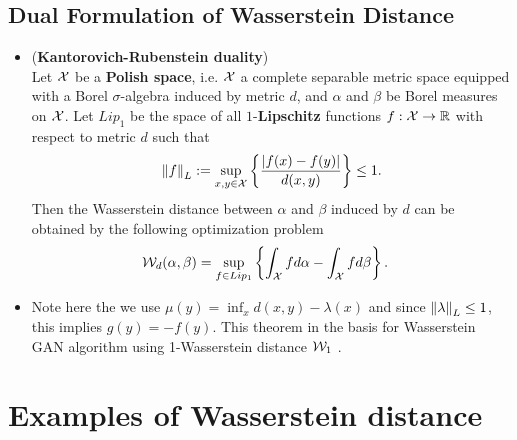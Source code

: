 \documentclass[11pt]{article}
\begin{document}
\subsection{Dual Formulation of Wasserstein Distance}
\begin{itemize}
\item \begin{theorem} (\textbf{Kantorovich-Rubenstein duality}) \citep{villani2009optimal}\\
Let ${\mathcal X}$ be a \textbf{Polish space}, i.e. ${\mathcal X}$ a complete separable metric space equipped with a Borel $\sigma$-algebra induced by metric $d$, and $\alpha$ and $\beta$ be Borel measures on ${\mathcal X}$. Let $Lip_1$ be the space of all 
$1$-\textbf{Lipschitz} functions $f: {\mathcal X} \to {\mathbb R}$ with respect to metric $d$  such that
\begin{align*}
\left\|f\right\|_{L}  := \sup_{x, y \in {\mathcal X}}\left\{\frac{\left\lvert f(x) - f(y) \right\rvert}{d(x, y)}\right\} \le 1.
\end{align*}
Then the Wasserstein distance between $\alpha$ and $\beta$ induced by $d$ can be obtained by the following optimization problem
\begin{align}
{\mathcal W}_{d}(\alpha, \beta) &= \sup_{f \in Lip_1}\left\{\int_{{\mathcal X}} f d\alpha  - \int_{{\mathcal X}} f d\beta\right\}. \label{eqn: wass_dist_dual}
\end{align} 
\end{theorem}

\item \begin{remark}
Note here the we use $\mu(y)=\inf_{x}d(x,y) - \lambda(x)$ and since $\left\|\lambda\right\|_{L} \le 1$, this implies $g(y)= - f(y)$. This theorem in the basis for Wasserstein GAN algorithm using 1-Wasserstein distance ${\mathcal W}_1$ \citep{arjovsky2017wasserstein}.
\end{remark}
\end{itemize}

\section{Examples of Wasserstein distance}
\end{document}
